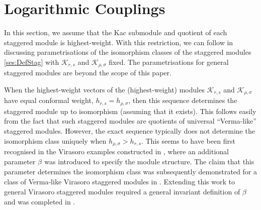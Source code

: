 \documentclass[a4paper,reqno,12pt]{report}
\theoremstyle{definition}
\numberwithin{equation}{section}
\newcommand{\Kac}[1]{\mathcal{K}_{#1}}       %
\newcommand{\logcoup}[2]{\beta_{#1}^{#2}}    %
\newcommand{\hw}{highest-weight}
\newcommand{\hwss}{\hw{} vectors}
\theoremstyle{plain}
\begin{document}
\section{Logarithmic Couplings} \label{app:LogCoup}

In this section, we assume that the Kac submodule and quotient of each staggered module is \hw{}.  With this restriction, we can follow \cite{RidSta09,CreLog13} in discussing parametrisations of the isomorphism classes of the staggered modules \eqref{ses:DefStag} with $\Kac{r,s}$ and $\Kac{\rho,\sigma}$ fixed.  The parametrisations for general staggered modules are beyond the scope of this paper.

When the \hwss{} of the (\hw{}) modules $\Kac{r,s}$ and $\Kac{\rho,\sigma}$ have equal conformal weight, $h_{r,s} = h_{\rho,\sigma}$, then this sequence determines the staggered module up to isomorphism (assuming that it exists).  This follows easily from the fact that such staggered modules are quotients \cite[Cor.~4.7]{RidSta09} of universal ``Verma-like'' staggered modules.  However, the exact sequence typically does not determine the isomorphism class uniquely when $h_{\rho,\sigma} > h_{r,s}$.  This seems to have been first recognised in the Virasoro examples constructed in \cite{GabInd96}, where an additional parameter $\logcoup{}{}$ was introduced to specify the module structure.  The claim that this parameter determines the isomorphism class was subsequently demonstrated for a class of Verma-like Virasoro staggered modules in \cite{RohRed96}.  Extending this work to general Virasoro staggered modules required a general invariant definition of $\logcoup{}{}$ \cite{RidPer07} and was completed in \cite{RidSta09}.
\end{document}
